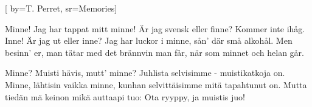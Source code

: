 [ 		
	by={T. Perret},					
	sr={Memories}]		
	
\beginverse*						
Minne! 
Jag har tappat mitt minne! 
Är jag svensk eller finne? 
Kommer inte ihåg.
Inne!
Är jag ut eller inne? 
Jag har luckor i minne, 
sån' där små alkohål. 
Men besinn' er, 
man tätar med det brännvin man får, 
när som minnet och helan går. 
\endverse						

\beginverse				
 Minne? Muisti hävis, mutt' minne?
Juhlista selvisimme
- muistikatkoja on.
Minne, lähtisin vaikka minne,
kunhan selvittäisimme
mitä tapahtunut on.
Mutta tiedän
mä keinon mikä auttaapi tuo:
Ota ryyppy, ja muistis juo!\endverse				
\endsong		
